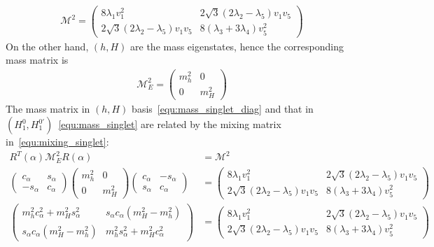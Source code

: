 \documentclass[12pt]{article}
\begin{document}
\begin{align}
\label{equ:mass_singlet}
\mathcal{M}^2 = \begin{pmatrix}
    8\lambda_1v_1^2 & 2\sqrt{3}(2\lambda_2 - \lambda_5)v_1v_5\\
    2\sqrt{3}(2\lambda_2-\lambda_5)v_1v_5 & 8(\lambda_3+3\lambda_4)v_5^2
\end{pmatrix}
\end{align}
On the other hand, $(h,H)$ are the mass eigenstates, hence the corresponding mass matrix is
\begin{align}
\label{equ:mass_singlet_diag}
\mathcal{M}^2_E = \begin{pmatrix}
    m_h^2 & 0 \\
    0 & m_H^2
\end{pmatrix}
\end{align}
The mass matrix in $(h,H)$ basis~\autoref{equ:mass_singlet_diag} and that in $(H_1^0,H_1^{0\prime})$~\autoref{equ:mass_singlet} are related by the mixing matrix in~\autoref{equ:mixing_singlet}:
\begin{align}
    R^T(\alpha)\mathcal{M}_E^2R(\alpha) &= \mathcal{M}^2\nonumber\\
    \begin{pmatrix}
        c_\alpha & s_\alpha \\
        -s_\alpha & c_\alpha
    \end{pmatrix}\begin{pmatrix}
        m_h^2 & 0 \\
        0 & m_H^2
    \end{pmatrix}\begin{pmatrix}
        c_\alpha & -s_\alpha \\
        s_\alpha & c_\alpha
    \end{pmatrix} &= \begin{pmatrix}
        8\lambda_1v_1^2 & 2\sqrt{3}(2\lambda_2 - \lambda_5)v_1v_5\\
        2\sqrt{3}(2\lambda_2-\lambda_5)v_1v_5 & 8(\lambda_3+3\lambda_4)v_5^2
    \end{pmatrix}\nonumber\\
    \begin{pmatrix}
        m_h^2c_\alpha^2+m_H^2s_\alpha^2 & s_\alpha c_\alpha (m_H^2-m_h^2)\\
        s_\alpha c_\alpha (m_H^2-m_h^2) & m_h^2 s_\alpha^2 + m_H^2 c_\alpha^2
    \end{pmatrix} &= \begin{pmatrix}
        8\lambda_1v_1^2 & 2\sqrt{3}(2\lambda_2 - \lambda_5)v_1v_5\\
        2\sqrt{3}(2\lambda_2-\lambda_5)v_1v_5 & 8(\lambda_3+3\lambda_4)v_5^2
    \end{pmatrix}
\end{align}
\end{document}
